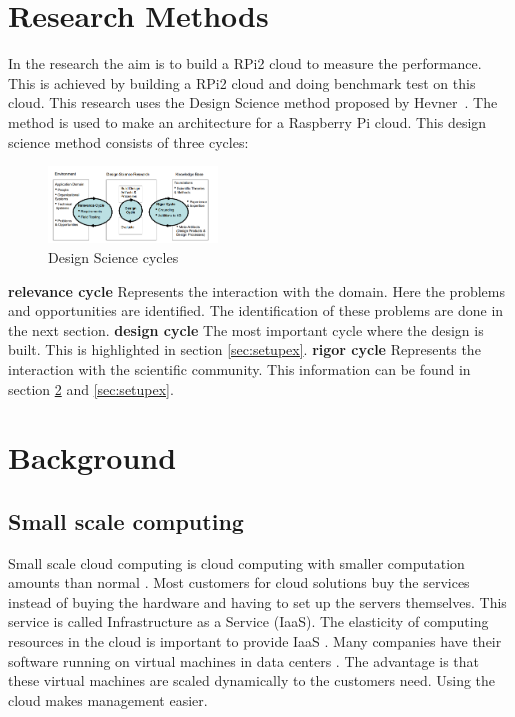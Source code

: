 \documentclass{sig-alternate-br}
\begin{document}
\section{Research Methods}
In the research the  aim is to build a RPi2 cloud to measure the performance. This is achieved by building a RPi2 cloud and doing benchmark test on this cloud. This research uses the Design Science method proposed by Hevner~\cite{hevner:2007}. The method is used to make an architecture for a Raspberry Pi cloud. This design science method consists of three cycles:
\begin{figure}[H]
	\centering 
	\includegraphics[width=0.4\textwidth]{Design_science.png}
	\caption{Design Science cycles \cite{hevner:2007}}
	\label{fig:design} %
\end{figure}
\textbf{relevance cycle} Represents the interaction with the domain. Here the problems and opportunities are identified. The identification of these problems are done in the next section. \newline 
\textbf{design cycle} The most important cycle where the design is built. This is highlighted in section \ref{sec:setupex}. \newline
\textbf{rigor cycle} Represents the interaction with the scientific community. This information can be found in section \ref{sec:back} and \ref{sec:setupex}.



\section{Background}\label{sec:back}
\subsection{Small scale computing}
Small scale cloud computing is cloud computing with smaller computation amounts than normal \cite{cox:2014}. Most customers for cloud solutions buy the services instead of buying the hardware and having to set up the servers themselves. This service is called Infrastructure as a Service (IaaS). The elasticity of computing resources in the cloud is important to provide IaaS \cite{Miettinen:2010:EEM:1863103.1863107}. Many companies have their software running on virtual machines in data centers \cite{beloglazov:2010}. The advantage is that these virtual machines are scaled dynamically to the customers need. Using the cloud makes  management easier. 
\end{document}
